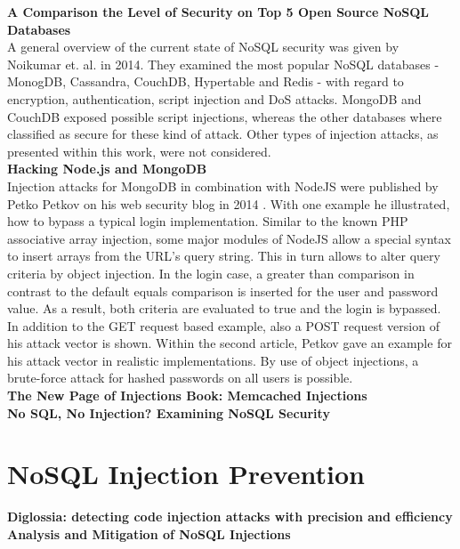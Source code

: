 \textbf{A Comparison the Level of Security on Top 5 Open Source NoSQL Databases} \cite{Noiumkar:2014} \\
A general overview of the current state of NoSQL security was given by Noikumar et. al. in 2014. They examined the most popular NoSQL databases - MonogDB, Cassandra, CouchDB, Hypertable and Redis - with regard to encryption, authentication, script injection and DoS attacks. MongoDB and CouchDB exposed possible script injections, whereas the other databases where classified as secure for these kind of attack. Other types of injection attacks, as presented within this work, were not considered. \\

\textbf{Hacking Node.js and MongoDB}\cite{Petkov:2014a, Petkov:2014b} \\
Injection attacks for MongoDB in combination with NodeJS were published by Petko Petkov on his web security blog in 2014 \cite{Petkov:2014a, Petkov:2014b}. With one example he illustrated, how to bypass a typical login implementation. Similar to the known PHP associative array injection, some major modules of NodeJS allow a special syntax to insert arrays from the URL's query string. This in turn allows to alter query criteria by object injection. In the login case, a greater than comparison in contrast to the default equals comparison is inserted for the user and password value. As a result, both criteria are evaluated to true and the login is bypassed. In addition to the GET request based example, also a POST request version of his attack vector is shown. Within the second article, Petkov gave an example for his attack vector in realistic implementations. By use of object injections, a brute-force attack for hashed passwords on all users is possible.\\



\textbf{The New Page of Injections Book: Memcached Injections} \cite{Novikov:2014} \\

\textbf{No SQL, No Injection? Examining NoSQL Security} \cite{Ron:2015} \\


\section{NoSQL Injection Prevention}

\textbf{Diglossia: detecting code injection attacks with precision and efficiency} \cite{Son:2013} \\

\textbf{Analysis and Mitigation of NoSQL Injections} \cite{Ron:2016} \\